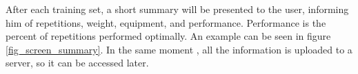 \documentclass{tk3-team}
\begin{document}
After each training set, a short summary will be presented to the user, informing him of repetitions, weight, equipment, and performance. Performance is the percent of repetitions performed optimally. An example can be seen in figure \ref{fig_screen_summary}. In the same moment , all the information is uploaded to a server, so it can be accessed later. %

\begin{figure}[!t]
\centering
{}
\hfil
{}
\hfil
{}
\\

\end{figure}
\end{document}
